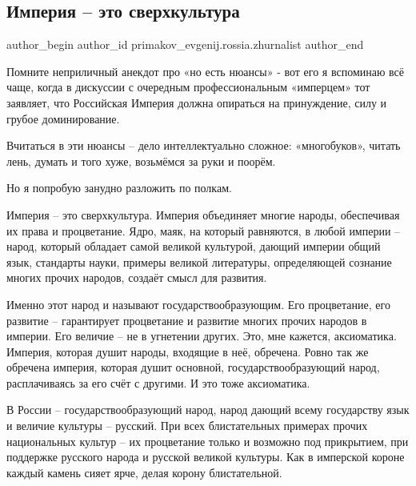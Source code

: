  
 
 
 
 
\subsection{Империя – это сверхкультура}
\ifcmt
 author_begin
   author_id primakov_evgenij.rossia.zhurnalist
 author_end
\fi

Помните неприличный анекдот про «но есть нюансы» - вот его я вспоминаю всё
чаще, когда в дискуссии с очередным профессиональным «имперцем» тот заявляет,
что Российская Империя должна опираться на принуждение, силу и грубое
доминирование.

Вчитаться в эти нюансы – дело интеллектуально сложное: «многобуков», читать
лень, думать и того хуже, возьмёмся за руки и поорём. 

Но я попробую занудно разложить по полкам.

Империя – это сверхкультура. Империя объединяет многие народы, обеспечивая их
права и процветание. Ядро, маяк, на который равняются, в любой империи – народ,
который обладает самой великой культурой, дающий империи общий язык, стандарты
науки, примеры великой литературы, определяющей сознание многих прочих народов,
создаёт смысл для развития.

Именно этот народ и называют государствообразующим. Его процветание, его
развитие – гарантирует процветание и развитие многих прочих народов в империи.
Его величие – не в угнетении других. Это, мне кажется, аксиоматика. Империя,
которая душит народы, входящие в неё, обречена. Ровно так же обречена империя,
которая душит основной, государствообразующий народ, расплачиваясь за его счёт
с другими. И это тоже аксиоматика.

В России – государствообразующий народ, народ дающий всему государству язык и
величие культуры – русский. При всех блистательных примерах прочих национальных
культур – их процветание только и возможно под прикрытием, при поддержке
русского народа и русской великой культуры. Как в имперской короне каждый
камень сияет ярче, делая корону блистательной.

